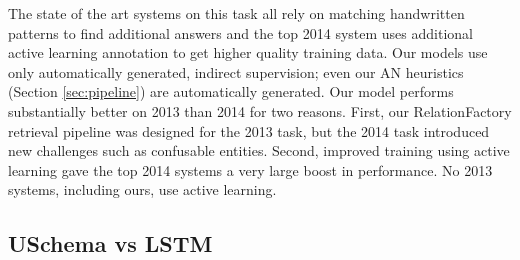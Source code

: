 The state of the art systems on this task all rely on matching handwritten patterns to find additional answers and the top 2014 system uses additional active learning annotation to get higher quality training data. Our models use only automatically generated, indirect supervision; even our AN heuristics (Section \ref{sec:pipeline}) are automatically generated. Our model performs substantially better on 2013 than 2014 for two reasons. First, our RelationFactory\citep{roth2014relationfactory} retrieval pipeline was designed for the 2013 task, but the 2014 task introduced new challenges such as confusable entities. Second, improved training using active learning gave the top 2014 systems a very large boost in performance. No 2013 systems, including ours, use active learning. 




\subsection{USchema vs LSTM \label{sec:uschema-lstm}}

